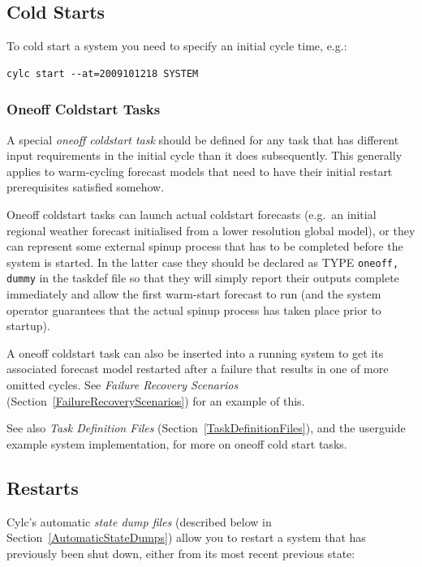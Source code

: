 \documentclass[11pt,a4paper]{article}
\begin{document}
\subsection{Cold Starts}

To cold start a system you need to specify an initial cycle time, e.g.:

\begin{lstlisting}
cylc start --at=2009101218 SYSTEM
\end{lstlisting}

\subsubsection{Oneoff Coldstart Tasks}

A special {\em oneoff coldstart task} should be defined for any task
that has different input requirements in the initial cycle than it does
subsequently. This generally applies to warm-cycling forecast models
that need to have their initial restart prerequisites satisfied somehow. 

Oneoff coldstart tasks can launch actual coldstart forecasts (e.g.\ an
initial regional weather forecast initialised from a lower resolution
global model), or they can represent some external spinup process that
has to be completed before the system is started. In the latter case
they should be declared as TYPE \lstinline=oneoff, dummy= in the taskdef
file so that they will simply report their outputs complete immediately
and allow the first warm-start forecast to run (and the system operator
guarantees that the actual spinup process has taken place prior to
startup).

A oneoff coldstart task can also be inserted into a running system to
get its associated forecast model restarted after a failure that results
in one of more omitted cycles. See {\em Failure Recovery Scenarios}
(Section~\ref{FailureRecoveryScenarios}) for an example of this. 

See also {\em Task Definition Files}
(Section~\ref{TaskDefinitionFiles}), and the userguide example system
implementation, for more on oneoff cold start tasks.

\subsection{Restarts}
\label{Restarts}

Cylc's automatic {\em state dump files} (described below in
Section~\ref{AutomaticStateDumps}) allow you to restart a system
that has previously been shut down, either from 
its most recent previous state:
\end{document}
